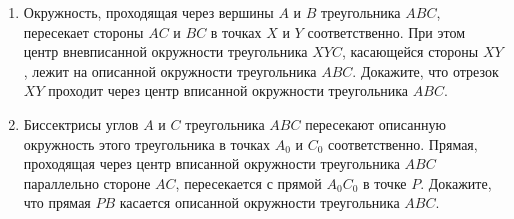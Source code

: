 \documentclass{article}
\begin{document}
\begin{enumerate}[label*=\protect\fbox{\arabic{enumi}}]
\item Окружность, проходящая через вершины $A$ и $B$ треугольника $ABC$, пересекает стороны $AC$ и $BC$ в точках $X$ и $Y$ соответственно. При этом центр вневписанной окружности треугольника $XYC$, касающейся стороны $XY$, лежит на описанной окружности треугольника $ABC$. Докажите, что отрезок $XY$ проходит через центр вписанной окружности треугольника $ABC$.

\item Биссектрисы углов $A$ и $C$ треугольника $ABC$ пересекают описанную окружность этого треугольника в точках $A_0$ и $C_0$ соответственно. Прямая, проходящая через центр вписанной окружности треугольника $ABC$ параллельно стороне $AC$, пересекается с прямой $A_0C_0$ в точке $P$. Докажите, что прямая $PB$ касается описанной окружности треугольника $ABC$.

\end{enumerate}
\end{document}

